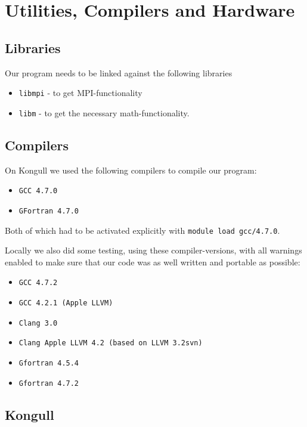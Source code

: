 \section{Utilities, Compilers and Hardware}

\subsection{Libraries}
Our program needs to be linked against the following libraries
\begin{itemize}
    \item{\texttt{libmpi}}  -  to get MPI-functionality
    \item{\texttt{libm}}  -  to get the necessary math-functionality.
\end{itemize}

\subsection{Compilers}
On Kongull we used the following compilers to compile our program:
\begin{itemize}
    \item{\texttt{GCC 4.7.0}}
    \item{\texttt{GFortran 4.7.0}}
\end{itemize}

Both of which had to be activated explicitly with \texttt{module load gcc/4.7.0}.

Locally we also did some testing, using these compiler-versions, with all warnings enabled to make sure that our code was as well written and portable as possible:
\begin{itemize}
    \item{\texttt{GCC 4.7.2}}
    \item{\texttt{GCC 4.2.1 (Apple LLVM)}}
    \item{\texttt{Clang 3.0}}
    \item{\texttt{Clang Apple LLVM 4.2 (based on LLVM 3.2svn)}}
    \item{\texttt{Gfortran 4.5.4}}
    \item{\texttt{Gfortran 4.7.2}}
\end{itemize}

\subsection{Kongull}

